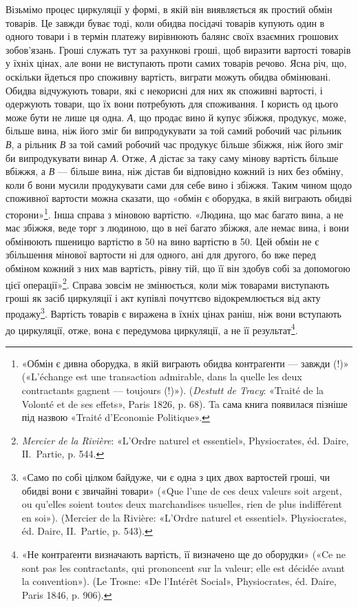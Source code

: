 Візьмімо процес циркуляції у формі, в якій він виявляється
як простий обмін товарів. Це завжди буває тоді, коли обидва
посідачі товарів купують один в одного товари і в термін платежу
вирівнюють балянс своїх взаємних грошових зобов’язань. Гроші
служать тут за рахункові гроші, щоб виразити вартості товарів
у їхніх цінах, але вони не виступають проти самих товарів речово.
Ясна річ, що, оскільки йдеться про споживну вартість,
виграти можуть обидва обмінювані. Обидва відчужують товари,
які є некорисні для них як споживні вартості, і одержують товари,
що їх вони потребують для споживання. І користь од цього може
бути не лише ця одна. \emph{А}, що продає вино й купує збіжжя, продукує,
може, більше вина, ніж його зміг би випродукувати за той
самий робочий час рільник \emph{В}, а рільник \emph{В} за той самий робочий
час продукує більше збіжжя, ніж його зміг би випродукувати
винар \emph{А}. Отже, \emph{А} дістає за таку саму мінову вартість більше
вбіжжя, а \emph{В} — більше вина, ніж дістав би відповідно кожний
із них без обміну, коли б вони мусили продукувати сами для себе
вино і збіжжя. Таким чином щодо споживної вартости можна
сказати, що «обмін є оборудка, в якій виграють обидві сторони»\footnote{
«Обмін є дивна оборудка, в якій виграють обидва контраґенти —
завжди (!)» («L’échange est une transaction admirable, dans la quelle les
deux contractants gagnent — toujours (!)»). (\emph{Destutt de Tracy}: «Traité de
la Volonté et de ses effets», Paris 1826, p. 68). Ta сама книга появилася пізніше
під назвою «Traité d’Economie Politique».
}.
Інша справа з міновою вартістю. «Людина, що має багато вина,
а не має збіжжя, веде торг з людиною, що в неї багато збіжжя,
але немає вина, і вони обмінюють пшеницю вартістю в 50 на
вино вартістю в 50. Цей обмін не є збільшення мінової вартости
ні для одного, ані для другого, бо вже перед обміном кожний
з них мав вартість, рівну тій, що її він здобув собі за допомогою
цієї операції»\footnote{
\emph{Mercier de la Rivière}: «L’Ordre naturel et essentiel», Physiocrates, éd.
Daire, IІ.~Partie, p. 544.
}. Справа зовсім не змінюється, коли між товарами
виступають гроші як засіб циркуляції і акт купівлі почуттєво
відокремлюється від акту продажу\footnote{
«Само по собі цілком байдуже, чи є одна з цих двох вартостей
гроші, чи обидві вони є звичайні товари» («Que l’une de ces deux valeurs
soit argent, ou qu’elles soient toutes deux marchandises usuelles, rien de
plus indifférent en soi»). (Mercier de la Rivière: «L’Ordre naturel et essentiel».
Physiocrates, éd. Daire, II.~Partie, p. 543).
}. Вартість товарів є виражена
в їхніх цінах раніш, ніж вони вступають до циркуляції, отже,
вона є передумова циркуляції, а не її результат\footnote{
«Не контраґенти визначають вартість, її визначено ще до оборудки»
(«Ce ne sont pas les contractants, qui prononcent sur la valeur; elle est
décidée avant la convention»). (Le Trosne: «De l’Intérêt Social», Physiocrates,
éd. Daire, Paris 1846, p. 906).
}.

